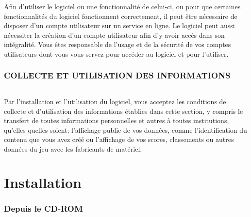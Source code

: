 \documentclass[titlepage, 11px, a4paper]{report}
\begin{document}
Afin d'utiliser le logiciel ou une fonctionnalité de celui-ci, ou pour que
certaines fonctionnalités du logiciel fonctionnent correctement, il peut être
nécessaire de disposer d'un compte utilisateur sur un service en ligne.
Le logiciel peut aussi nécessiter la création d'un compte utilisateur
afin d'y avoir accès dans son intégralité. Vous êtes responsable de
l'usage et de la sécurité de vos comptes utilisateurs dont vous vous servez
pour accéder au logiciel et pour l'utiliser. \\


\section*{COLLECTE ET UTILISATION DES INFORMATIONS}
\paragraph*{} \hspace{0pt}
Par l'installation et l'utilisation du logiciel, vous acceptez les conditions
de collecte et d'utilisation des informations établies dans cette section, y
compris le transfert de toutes informations personnelles et autres à toutes
institutions, qu'elles quelles soient; l'affichage public de vos données, comme
l'identification du contenu que vous avez créé ou l'affichage de vos scores,
classements ou autres données du jeu avec les fabricants de matériel. \\


\newpage


\part{Installation} 

\section{Depuis le CD-ROM}
\end{document}
